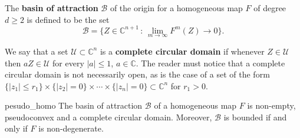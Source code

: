 \begin{mydef}{}{}
The {\bf basin of attraction} $\mathcal{B}$ of the origin for a homogeneous map $F$ of degree $d \geq 2$ is defined to be the set
$$\mathcal{B} = \{Z \in \mathbb{C}^{n+1} \,:\, \lim_{m \rightarrow \infty} F^{m}(Z) \rightarrow 0\}.$$
\end{mydef}

We say that a set $\mathcal{U}\subset \mathbb{C}^n$ is a {\bf complete circular domain} if whenever $Z\in \mathcal{U}$ then $aZ\in \mathcal{U}$ for every $|a|\leq 1$, $a\in \mathbb{C}$. The reader must notice that a complete circular domain is not necessarily open, as is the case of a set of the form $\{|z_1|\leq r_1\}\times \{|z_2|=0\}\times \cdots\times \{|z_n|=0\} \subset \mathbb{C}^n$ for $r_1> 0$.\\

 
\begin{myprop}{}{pesudo_homo}
The basin of attraction $\mathcal{B}$ of a homogeneous map $F$ is non-empty, pseudoconvex and a complete circular domain. Moreover, $\mathcal{B}$ is bounded if and only if $F$ is non-degenerate.
\end{myprop}

